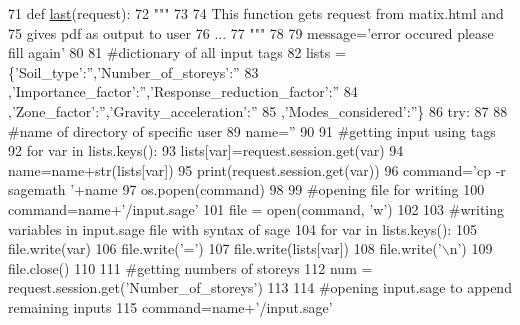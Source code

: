 \begin{DoxyCode}
71 \textcolor{keyword}{def }\hyperlink{namespacecivilsage_1_1views_aed47fb0740a2fa14693f697905788719}{last}(request):
72     \textcolor{stringliteral}{"""}
73 \textcolor{stringliteral}{}
74 \textcolor{stringliteral}{    This function gets request from matix.html and}
75 \textcolor{stringliteral}{    gives pdf as output to user}
76 \textcolor{stringliteral}{    ...}
77 \textcolor{stringliteral}{    """}
78 
79     message=\textcolor{stringliteral}{'error occured please fill again'}
80 
81     \textcolor{comment}{#dictionary of all input tags}
82     lists = \{\textcolor{stringliteral}{'Soil\_type'}:\textcolor{stringliteral}{''},\textcolor{stringliteral}{'Number\_of\_storeys'}:\textcolor{stringliteral}{''}
83     ,\textcolor{stringliteral}{'Importance\_factor'}:\textcolor{stringliteral}{''},\textcolor{stringliteral}{'Response\_reduction\_factor'}:\textcolor{stringliteral}{''}
84     ,\textcolor{stringliteral}{'Zone\_factor'}:\textcolor{stringliteral}{''},\textcolor{stringliteral}{'Gravity\_acceleration'}:\textcolor{stringliteral}{''}
85     ,\textcolor{stringliteral}{'Modes\_considered'}:\textcolor{stringliteral}{''}\}
86     \textcolor{keywordflow}{try}:
87 
88         \textcolor{comment}{#name of directory of specific user}
89         name=\textcolor{stringliteral}{''}
90 
91         \textcolor{comment}{#getting input using tags}
92         \textcolor{keywordflow}{for} var \textcolor{keywordflow}{in} lists.keys():
93             lists[var]=request.session.get(var)
94             name=name+str(lists[var])
95         print(request.session.get(var))
96         command=\textcolor{stringliteral}{'cp -r sagemath '}+name
97         os.popen(command)
98 
99         \textcolor{comment}{#opening file for writing}
100         command=name+\textcolor{stringliteral}{'/input.sage'}
101         file = open(command, \textcolor{stringliteral}{'w'})
102 
103         \textcolor{comment}{#writing variables in input.sage file with syntax of sage}
104         \textcolor{keywordflow}{for} var \textcolor{keywordflow}{in} lists.keys():
105             file.write(var)
106             file.write(\textcolor{stringliteral}{'='})
107             file.write(lists[var])
108             file.write(\textcolor{stringliteral}{'\(\backslash\)n'})
109         file.close()
110 
111         \textcolor{comment}{#getting numbers of storeys}
112         num = request.session.get(\textcolor{stringliteral}{'Number\_of\_storeys'})
113 
114         \textcolor{comment}{#opening input.sage to append remaining inputs}
115         command=name+\textcolor{stringliteral}{'/input.sage'}

\end{DoxyCode}
